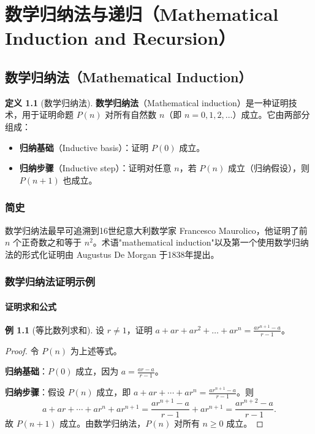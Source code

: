 \documentclass[UTF8,11pt,a4paper]{ctexbook}   %
\theoremstyle{definition}
\newtheorem{definition}{定义}[section]
\newtheorem{example}{例}[section]
\begin{document}
\chapter{数学归纳法与递归（Mathematical Induction and Recursion）}

\section{数学归纳法（Mathematical Induction）}

\begin{definition}[数学归纳法]
\textbf{数学归纳法}（Mathematical induction）是一种证明技术，用于证明命题 $P(n)$ 对所有自然数 $n$（即 $n=0,1,2,\dots$）成立。它由两部分组成：
\begin{itemize}
    \item \textbf{归纳基础}（Inductive basis）：证明 $P(0)$ 成立。
    \item \textbf{归纳步骤}（Inductive step）：证明对任意 $n$，若 $P(n)$ 成立（归纳假设），则 $P(n+1)$ 也成立。
\end{itemize}
\end{definition}

\subsection{简史}

数学归纳法最早可追溯到16世纪意大利数学家 Francesco Maurolico，他证明了前 $n$ 个正奇数之和等于 $n^2$。术语"mathematical induction"以及第一个使用数学归纳法的形式化证明由 Augustus De Morgan 于1838年提出。

\subsection{数学归纳法证明示例}

\subsubsection{证明求和公式}

\begin{example}[等比数列求和]
设 $r \neq 1$，证明 $a + ar + ar^2 + \dots + ar^n = \frac{ar^{n+1}-a}{r-1}$。
\end{example}

\begin{proof}
令 $P(n)$ 为上述等式。

\textbf{归纳基础}：$P(0)$ 成立，因为 $a = \frac{ar-a}{r-1}$。

\textbf{归纳步骤}：假设 $P(n)$ 成立，即 $a + ar + \cdots + ar^n = \frac{ar^{n+1}-a}{r-1}$。则
\[
a + ar + \cdots + ar^n + ar^{n+1} = \frac{ar^{n+1}-a}{r-1} + ar^{n+1} = \frac{ar^{n+2}-a}{r-1}.
\]
故 $P(n+1)$ 成立。由数学归纳法，$P(n)$ 对所有 $n \geq 0$ 成立。
\end{proof}
\end{document}
